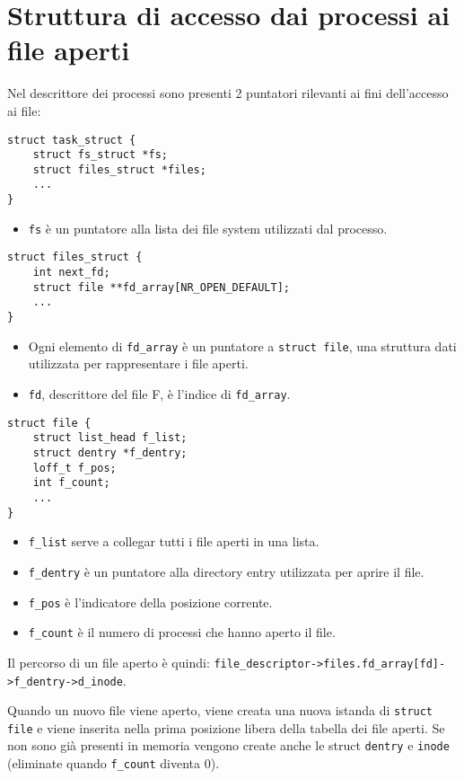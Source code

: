 \documentclass[12pt, a4paper]{report}
\begin{document}
\section{Struttura di accesso dai processi ai file aperti}
Nel descrittore dei processi sono presenti 2 puntatori rilevanti ai fini
dell'accesso ai file:
\begin{verbatim}
struct task_struct {
    struct fs_struct *fs;
    struct files_struct *files;
    ...
}
\end{verbatim}
\begin{itemize}
	\item \texttt{fs} è un puntatore alla lista dei file system utilizzati dal
		processo.
\end{itemize}
\begin{verbatim}
struct files_struct {
    int next_fd;
    struct file **fd_array[NR_OPEN_DEFAULT];
    ...
}
\end{verbatim}
\begin{itemize}
	\item Ogni elemento di \texttt{fd\_array} è un puntatore a \texttt{struct
		file}, una struttura dati utilizzata per rappresentare i file aperti.
	\item \texttt{fd}, descrittore del file F, è l'indice di \texttt{fd\_array}.
\end{itemize}

\begin{verbatim}
struct file {
    struct list_head f_list;
    struct dentry *f_dentry;
    loff_t f_pos;
    int f_count;
    ...
}
\end{verbatim}
\begin{itemize}
	\item \texttt{f\_list} serve a collegar tutti i file aperti in una lista.
	\item \texttt{f\_dentry} è un puntatore alla directory entry utilizzata per
		aprire il file.
	\item \texttt{f\_pos} è l'indicatore della posizione corrente.
	\item \texttt{f\_count} è il numero di processi che hanno aperto il file.
\end{itemize}
Il percorso di un file aperto è quindi:
\texttt{file\_descriptor->files.fd\_array[fd]->f\_dentry->d\_inode}.

Quando un nuovo file viene aperto, viene creata una nuova istanda di
\texttt{struct file} e viene inserita nella prima posizione libera della tabella
dei file aperti. Se non sono già presenti in memoria vengono create anche le
struct \texttt{dentry} e \texttt{inode} (eliminate quando \texttt{f\_count}
diventa 0).
\end{document}
